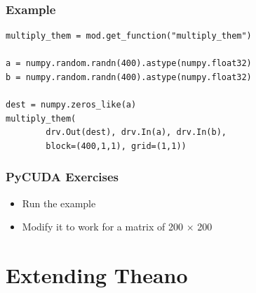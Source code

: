 \documentclass[a4paper,9pt]{beamer}
\begin{document}
\begin{frame}[fragile]
\frametitle{Example}
\begin{Verbatim}
multiply_them = mod.get_function("multiply_them")

a = numpy.random.randn(400).astype(numpy.float32)
b = numpy.random.randn(400).astype(numpy.float32)

dest = numpy.zeros_like(a)
multiply_them(
        drv.Out(dest), drv.In(a), drv.In(b),
        block=(400,1,1), grid=(1,1))
\end{Verbatim}
\end{frame}

\begin{frame}
\frametitle{PyCUDA Exercises}
\begin{itemize}
\item Run the example
\item Modify it to work for a matrix of 200 $\times$ 200
\end{itemize}
\end{frame}




\section{Extending Theano}
\end{document}
